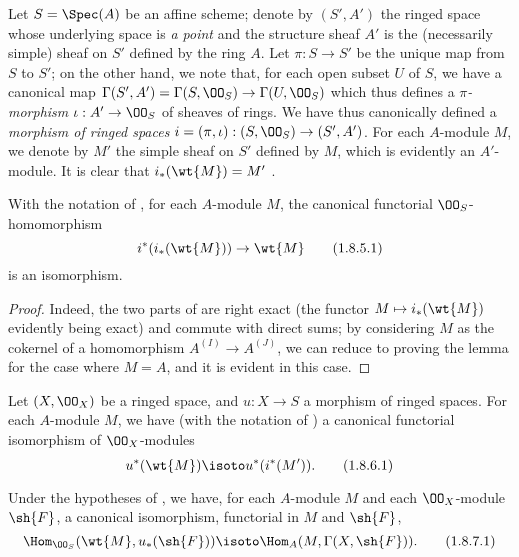 \begin{env}[1.8.4]
\label{1.1.8.4}
Let $S=\Spec(A)$ be an affine scheme;
denote by $(S',A')$ the ringed space whose underlying space is \emph{a point} and the structure sheaf $A'$ is the (necessarily simple) sheaf on $S'$ defined by the ring $A$.
Let $\pi:S\to S'$ be the unique map from $S$ to $S'$;
on the other hand, we note that, for each open subset $U$ of $S$, we have a canonical map $\Gamma(S',A')=\Gamma(S,\OO_S)\to\Gamma(U,\OO_S)$ which thus defines a \emph{$\pi$-morphism} $\iota:A'\to\OO_S$ of sheaves of rings.
We have thus canonically defined a \emph{morphism of ringed spaces $i=(\pi,\iota):(S,\OO_S)\to(S',A')$}.
For each $A$-module $M$, we denote by $M'$ the simple sheaf on $S'$ defined by $M$, which is evidently an $A'$-module.
It is clear that $i_*(\wt{M})=M'$ .
\end{env}

\begin{lem}[1.8.5]
\label{1.1.8.5}
With the notation of , for each $A$-module $M$, the canonical functorial $\OO_S$-homomorphism 
\begin{equation*}
  \label{1.1.8.5.1}
  i^*(i_*(\wt{M}))\to\wt{M}
  \tag{1.8.5.1}
\end{equation*}
is an isomorphism.
\end{lem}

\begin{proof}
\label{proof-1.1.8.5}
Indeed, the two parts of  are right exact (the functor $M\mapsto i_*(\wt{M})$ evidently being exact) and commute with direct sums;
by considering $M$ as the cokernel of a homomorphism $A^{(I)}\to A^{(J)}$, we can reduce to proving the lemma for the case where $M=A$, and it is evident in this case.
\end{proof}

\begin{cor}[1.8.6]
\label{1.1.8.6}
Let $(X,\OO_X)$ be a ringed space, and $u:X\to S$ a morphism of ringed spaces.
For each $A$-module $M$, we have (with the notation of ) a canonical functorial isomorphism of $\OO_X$-modules
\begin{equation*}
  \label{1.1.8.6.1}
  u^*(\wt{M})\isoto u^*(i^*(M')).
  \tag{1.8.6.1}
\end{equation*}
\end{cor}

\begin{cor}[1.8.7]
\label{1.1.8.7}
Under the hypotheses of , we have, for each $A$-module $M$ and each $\OO_X$-module $\sh{F}$, a canonical isomorphism, functorial in $M$ and $\sh{F}$,
\begin{equation*}
  \label{1.1.8.7.1}
  \Hom_{\OO_S}(\wt{M},u_*(\sh{F}))\isoto\Hom_A(M,\Gamma(X,\sh{F})).
  \tag{1.8.7.1}
\end{equation*}
\end{cor}

